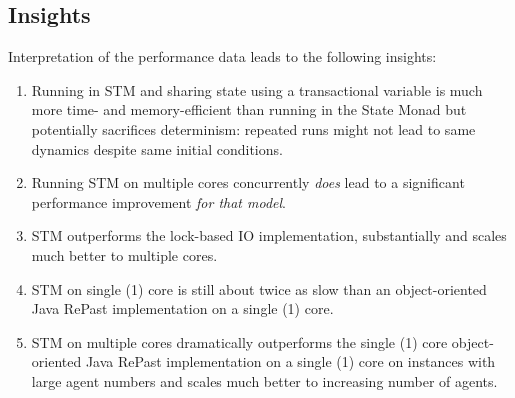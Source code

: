 
\subsection{Insights}
Interpretation of the performance data leads to the following insights:
\begin{enumerate}
	\item Running in STM and sharing state using a transactional variable is much more time- and memory-efficient than running in the State Monad but potentially sacrifices determinism: repeated runs might not lead to same dynamics despite same initial conditions.
	\item Running STM on multiple cores concurrently \textit{does} lead to a significant performance improvement \textit{for that model}.
	\item STM outperforms the lock-based IO implementation, substantially and scales much better to multiple cores.
	\item STM on single (1) core is still about twice as slow than an object-oriented Java RePast implementation on a single (1) core.
	\item STM on multiple cores dramatically outperforms the single (1) core object-oriented Java RePast implementation on a single (1) core on instances with large agent numbers and scales much better to increasing number of agents.
\end{enumerate}